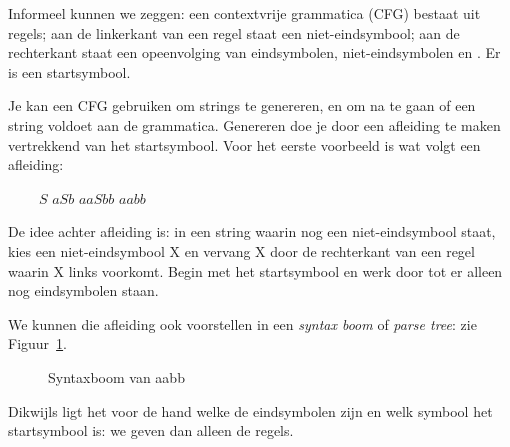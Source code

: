 Informeel kunnen we zeggen: een contextvrije grammatica (CFG) bestaat
uit regels; aan de linkerkant van een regel staat een
niet-eindsymbool; aan de rechterkant staat een opeenvolging van
eindsymbolen, niet-eindsymbolen en \eps. Er is een startsymbool.  

Je kan een CFG gebruiken om strings te genereren, en om na te gaan of
een string voldoet aan de grammatica. Genereren doe je door een
afleiding te maken vertrekkend van het startsymbool. Voor het eerste
voorbeeld is wat volgt een afleiding:

$~~~~~~~~~~S$ \rpijl $aSb$ \rpijl $aaSbb$ \rpijl $aabb$


De idee achter afleiding is: in een string waarin nog een
niet-eindsymbool staat, kies een niet-eindsymbool X en vervang X door
de rechterkant van een regel waarin X links voorkomt. Begin met het
startsymbool en werk door tot er alleen nog eindsymbolen staan.


We kunnen die afleiding ook voorstellen in een {\em syntax boom} of
{\em parse tree}: zie Figuur~\ref{parsetree1}.

\medskip
\begin{figure}[h]
\caption{Syntaxboom van aabb \label{parsetree1}}
\end{figure}


Dikwijls ligt het voor de hand welke de eindsymbolen zijn en welk
symbool het startsymbool is: we geven dan alleen de regels.

